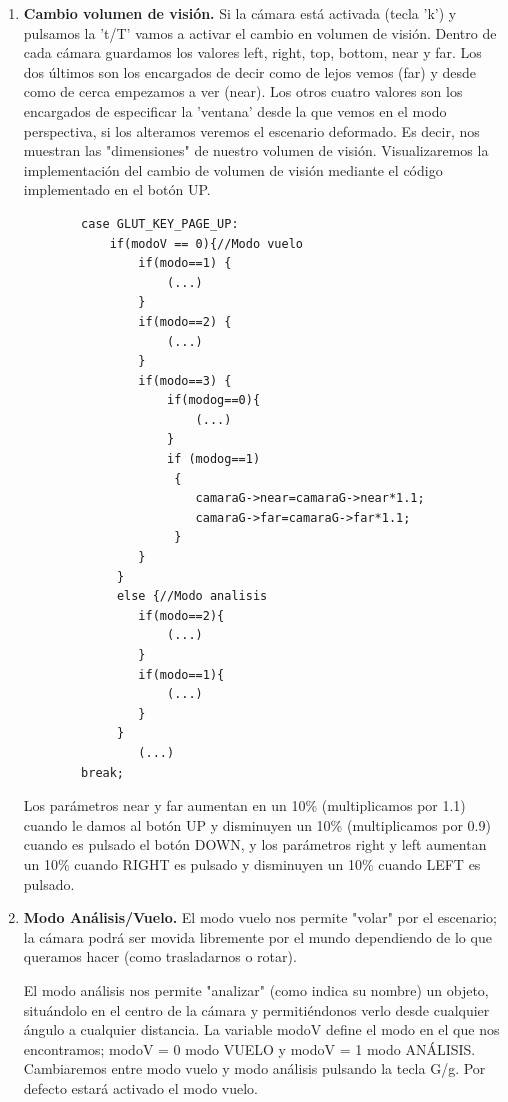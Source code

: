 \documentclass[12pt,a4paper]{article}
\begin{document}
\begin{enumerate}
\begin{enumerate}
\begin{enumerate}
\item \textbf{Cambio volumen de visión.}
Si la cámara está activada (tecla 'k') y pulsamos la 't/T' vamos a activar el cambio en volumen de visión.\newline
Dentro de cada cámara guardamos los valores left, right, top, bottom, near y far. Los dos últimos son los encargados de decir como de lejos vemos (far) y desde como de cerca empezamos a ver (near). Los otros cuatro valores son los encargados de especificar la 'ventana' desde la que vemos en el modo perspectiva, si los alteramos veremos el escenario deformado. Es decir, nos muestran las "dimensiones" de nuestro volumen de visión.\newline
Visualizaremos la implementación del cambio de volumen de visión mediante el código implementado en el botón UP.
\begin{lstlisting}
        case GLUT_KEY_PAGE_UP:
        	if(modoV == 0){//Modo vuelo
                if(modo==1) {
					(...)
                }
                if(modo==2) {
   					(...)
                }
               	if(modo==3) {
               		if(modog==0){
						(...)
                    }
                    if (modog==1)
                     {
                		camaraG->near=camaraG->near*1.1;
                		camaraG->far=camaraG->far*1.1;
                     } 
                }
             }
             else {//Modo analisis
             	if(modo==2){
             		(...)
             	}
             	if(modo==1){
             		(...)
             	}
             }
                (...)
        break;
\end{lstlisting}

Los parámetros near y far aumentan en un 10\% (multiplicamos por 1.1) cuando le damos al botón UP y disminuyen un 10\% (multiplicamos por 0.9) cuando es pulsado el botón DOWN, y los parámetros right y left aumentan un 10\% cuando RIGHT es pulsado y disminuyen un 10\% cuando LEFT es pulsado. 

\item \textbf{Modo Análisis/Vuelo.}
El modo vuelo nos permite "volar" por el escenario; la cámara podrá ser movida libremente por el mundo dependiendo de lo que queramos hacer (como trasladarnos o rotar).

El modo análisis nos permite "analizar" (como indica su nombre) un objeto, situándolo en el centro de la cámara y permitiéndonos verlo desde cualquier ángulo a cualquier distancia.
La variable modoV define el modo en el que nos encontramos; modoV = 0 modo VUELO y modoV = 1 modo ANÁLISIS.
Cambiaremos entre modo vuelo y modo análisis pulsando la tecla G/g. Por defecto estará activado el modo vuelo.



\end{enumerate}
\end{enumerate}
\end{enumerate}
\end{document}
